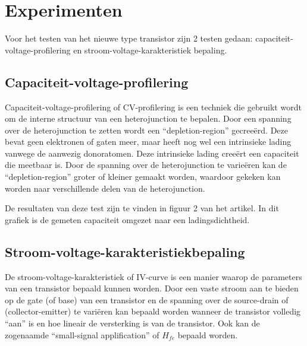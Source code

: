 \documentclass[11pt]{article}
\begin{document}
\newpage

\section{Experimenten}
Voor het testen van het nieuwe type transistor zijn 2 testen gedaan: capaciteit-voltage-profilering en stroom-voltage-karakteristiek bepaling.


\subsection{Capaciteit-voltage-profilering}
Capaciteit-voltage-profilering of CV-profilering is een techniek die gebruikt wordt om de interne structuur van een heterojunction te bepalen. Door een spanning over de heterojunction te zetten wordt een ``depletion-region'' gecree\"erd. Deze bevat geen elektronen of gaten meer, maar heeft nog wel een intrinsieke lading vanwege de aanwezig donoratomen. Deze intrinsieke lading cree\"ert een capaciteit die meetbaar is. Door de spanning over de heterojunction te varie\"eren kan de ``depletion-region'' groter of kleiner gemaakt worden, waardoor gekeken kan worden naar verschillende delen van de heterojunction.

De resultaten van deze test zijn te vinden in figuur 2 van het artikel. In dit grafiek is de gemeten capaciteit omgezet naar een ladingsdichtheid.

\subsection{Stroom-voltage-karakteristiekbepaling}
De stroom-voltage-karakteristiek of IV-curve is een manier waarop de parameters van een transistor bepaald kunnen worden. Door een vaste stroom aan te bieden op de gate (of base) van een transistor en de spanning over de source-drain of (collector-emitter) te vari\"eren kan bepaald worden wanneer de transistor volledig ``aan'' is en hoe lineair de versterking is van de transistor. Ook kan de zogenaamde ``small-signal applification'' of $H_{fe}$ bepaald worden.
\end{document}
